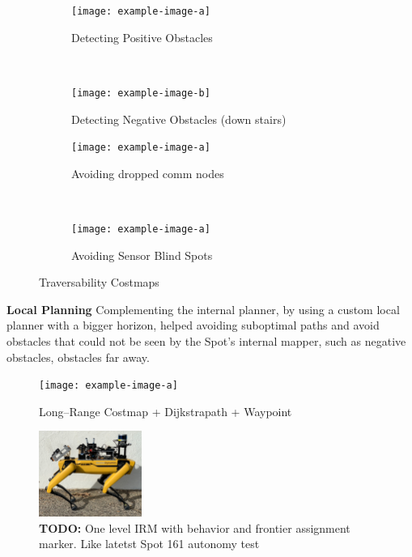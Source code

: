 \documentclass[a4paper, 10pt, conference]{ieeeconf}      %
\begin{document}
\begin{figure}[thpb]
   \centering
    \begin{subfigure}[t]{0.5\linewidth}
        \centering
        \texttt{[image: example-image-a]}
        \caption{Detecting Positive Obstacles}
        \label{fig:trav_costmap_pos_obs_wall}
    \end{subfigure}%
    ~ 
    \begin{subfigure}[t]{0.5\linewidth}
        \centering
        \texttt{[image: example-image-b]}
        \caption{Detecting Negative Obstacles (down stairs)}
        \label{fig:trav_costmap_neg_obs_stairs}
    \end{subfigure}
        \begin{subfigure}[t]{0.5\linewidth}
        \centering
        \texttt{[image: example-image-a]}
        \caption{Avoiding dropped comm nodes}
        \label{fig:trav_costmap_comm_nodes}
    \end{subfigure}%
    ~ 
        \begin{subfigure}[t]{0.5\linewidth}
        \centering
        \texttt{[image: example-image-a]}
        \caption{Avoiding Sensor Blind Spots}
        \label{trav_costmapb_bd_blindspot}
    \end{subfigure}%
    \caption{Traversability Costmaps}
\end{figure}

\textbf{Local Planning}
Complementing the internal planner, by using a custom local planner with a bigger horizon, helped avoiding suboptimal paths and avoid obstacles that could not be seen by the Spot's internal mapper, such as negative obstacles, obstacles far away.
\begin{figure}[thpb]
  \centering
  \texttt{[image: example-image-a]}
  \caption{Long--Range Costmap + Dijkstrapath + Waypoint}
  \label{fig:local_planner}
\end{figure}

\begin{figure}[thpb]
  \centering
  \includegraphics[width=0.3\textwidth]{spot_iros/graphics/spot_payload.jpg}
  \caption{\textbf{TODO:} One level IRM with behavior and frontier assignment marker. Like latetst Spot 161 autonomy test}
  \label{figurelabel}
\end{figure}
\end{document}
